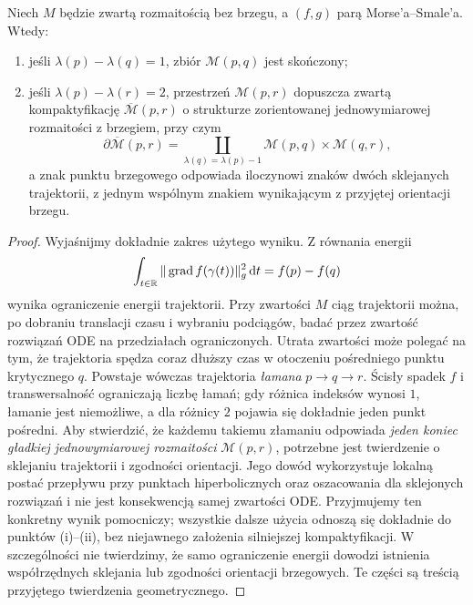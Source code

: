\begin{twierdzenie}
\label{thm:morse-compact-v10}
Niech $M$ będzie zwartą rozmaitością bez brzegu,
a $(f,g)$ parą Morse'a--Smale'a. Wtedy:
\begin{enumerate}[label=(\roman*)]
\item jeśli $\lambda(p)-\lambda(q)=1$, zbiór $\mathcal M(p,q)$
      jest skończony;
\item jeśli $\lambda(p)-\lambda(r)=2$, przestrzeń
      $\mathcal M(p,r)$ dopuszcza zwartą kompaktyfikację
      $\overline{\mathcal M}(p,r)$ o strukturze zorientowanej
      jednowymiarowej rozmaitości z brzegiem, przy czym
      \[
       \partial\overline{\mathcal M}(p,r)=
       \coprod_{\lambda(q)=\lambda(p)-1}
       \mathcal M(p,q)\times\mathcal M(q,r),
      \]
      a znak punktu brzegowego odpowiada iloczynowi znaków
      dwóch sklejanych trajektorii, z jednym wspólnym znakiem
      wynikającym z przyjętej orientacji brzegu.
\end{enumerate}
\end{twierdzenie}
\begin{proof}
Wyjaśnijmy dokładnie zakres użytego wyniku. Z równania energii
\[
\int_{t\in\mathbb{R}}\|\operatorname{grad}f(\gamma(t))\|_g^2\,\mathrm d t
=f(p)-f(q)
\]
wynika ograniczenie energii trajektorii.
Przy zwartości $M$ ciąg trajektorii można, po dobraniu translacji
czasu i wybraniu podciągów, badać przez zwartość rozwiązań ODE
na przedziałach ograniczonych. Utrata zwartości może polegać na tym,
że trajektoria spędza coraz dłuższy czas w otoczeniu pośredniego
punktu krytycznego $q$. Powstaje wówczas trajektoria
\emph{łamana} $p\to q\to r$. Ścisły spadek $f$
i transwersalność ograniczają liczbę łamań; gdy różnica
indeksów wynosi $1$, łamanie jest niemożliwe, a dla różnicy
$2$ pojawia się dokładnie jeden punkt pośredni.
Aby stwierdzić, że każdemu takiemu złamaniu odpowiada
\emph{jeden koniec gładkiej jednowymiarowej rozmaitości}
$\mathcal M(p,r)$, potrzebne jest twierdzenie o sklejaniu
trajektorii i zgodności orientacji. Jego dowód wykorzystuje
lokalną postać przepływu przy punktach hiperbolicznych
oraz oszacowania dla sklejonych rozwiązań i nie jest
konsekwencją samej zwartości ODE. Przyjmujemy ten
konkretny wynik pomocniczy; wszystkie dalsze użycia
odnoszą się dokładnie do punktów (i)--(ii), bez
niejawnego założenia silniejszej kompaktyfikacji.
W szczególności nie twierdzimy, że samo ograniczenie energii
dowodzi istnienia współrzędnych sklejania lub zgodności
orientacji brzegowych. Te części są treścią przyjętego
twierdzenia geometrycznego.
\end{proof}

